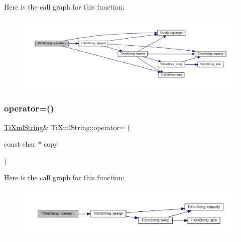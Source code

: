 Here is the call graph for this function\+:
\nopagebreak
\begin{figure}[H]
\begin{center}
\leavevmode
\includegraphics[width=350pt]{class_ti_xml_string_afdcae5ea2b4d9e194dc21226b817f417_cgraph}
\end{center}
\end{figure}
\mbox{\label{class_ti_xml_string_ae0bc6147afc0ec2aa0da3a3c0a8fcfb0}} 
\subsubsection{\texorpdfstring{operator=()}{operator=()}\hspace{0.1cm}{\footnotesize\ttfamily [1/2]}}
{\footnotesize\ttfamily \hyperlink{class_ti_xml_string}{Ti\+Xml\+String}\& Ti\+Xml\+String\+::operator= (\begin{DoxyParamCaption}\item[{const char $\ast$}]{copy }\end{DoxyParamCaption})\hspace{0.3cm}{\ttfamily [inline]}}

Here is the call graph for this function\+:
\nopagebreak
\begin{figure}[H]
\begin{center}
\leavevmode
\includegraphics[width=350pt]{class_ti_xml_string_ae0bc6147afc0ec2aa0da3a3c0a8fcfb0_cgraph}
\end{center}
\end{figure}
\mbox{\label{class_ti_xml_string_ab1f1f5d3eceaa0f22d0a7e6055ea81b0}} 
